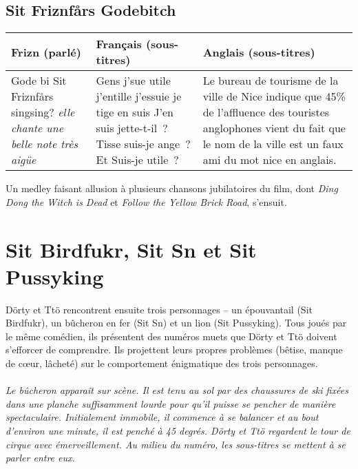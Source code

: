 \documentclass[a4paper]{article}
\newcommand{\mshrule}{}
\newcommand{\mssection}[1]{\section{#1}}
\begin{document}
\subsection*{Sit Friznfårs Godebitch}
\begin{center}
\begin{tabular}{|p{}|p{}|p{}|}\hline
Frizn (parlé) & Français (sous-titres) & Anglais (sous-titres) \\\hline
Gode bi Sit Friznfårs singsing? \emph{elle chante une belle note très
aigüe} &
Gens j'sue utile j'entille j'essuie je tige en suis J'en suis
jette-t-il~? Tisse suis-je ange~? Et Suis-je utile~?&
Le bureau de tourisme de la ville de Nice indique que 45\% de l'affluence
des touristes anglophones vient du fait que le nom de la ville est un faux ami du
mot nice en anglais.  \\\hline
\end{tabular}
\end{center}\par
\begin{comment}
\subsection*{Sit Friznfårs Godebitch}
\begin{center}
\begin{tabular}{|p{0.3\textwidth}|p{0.3\textwidth}|p{0.3\textwidth}|}\hline
Frizn (parlé) & Français (sous-titres) & Anglais (sous-titres) \\\hline
mmmmmmmmmmmmmmmm SIT DRISIGFÅRS BUK, EIN, DRI, DRI, DRI, EIN  mmmmmmmmmmmmmmmm &
C'est parti, mon kiki et n'oubliez pas : Un nain qui a grandi ne devient pas
géant.&
Say party, monkey key. And don't forget that a little person and a Village
Person are NOT the same thing.  \\\hline
\end{tabular}
\end{center}\par\hfill\\
\end{comment}
\mshrule
Un medley faisant allusion à plusieurs chansons jubilatoires du film,
dont \emph{Ding Dong the Witch is Dead} et \emph{Follow the Yellow Brick
Road}, s'ensuit.
\mssection{Sit Birdfukr, Sit Sn et Sit Pussyking}
Dörty et Ttö rencontrent ensuite trois personnages -- un épouvantail (Sit
Birdfukr), un bûcheron en fer (Sit Sn) et un lion (Sit Pussyking).  Tous
joués par le même comédien, ils présentent des numéros muets que Dörty
et Ttö doivent s'efforcer de comprendre. Ils projettent leurs propres
problèmes (bêtise, manque de cœur, lâcheté) sur le comportement énigmatique
des trois personnages.
\\\hfill\\
\mshrule
\emph{Le bûcheron apparaît sur scène. Il est tenu au sol par des chaussures
de ski fixées dans une planche suffisamment lourde pour qu’il puisse se
pencher de manière spectaculaire. Initialement immobile, il commence à se
balancer et au bout d’environ une minute, il est penché à 45 degrés. Dörty
et Ttö regardent le tour de cirque avec émerveillement. Au milieu du numéro,
les sous-titres se mettent à se parler entre eux.}
\end{document}
